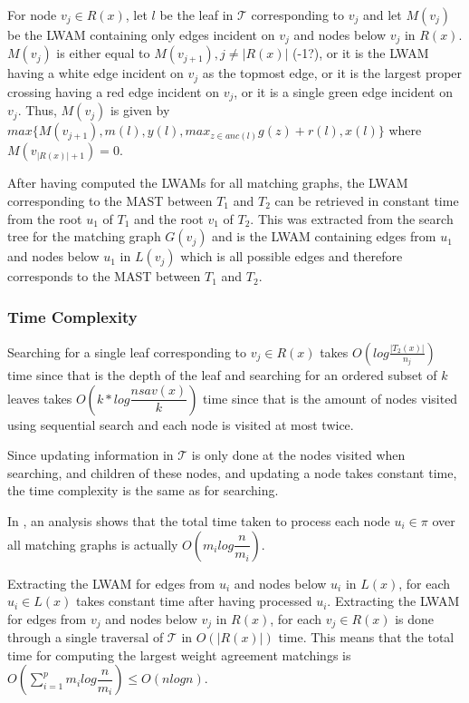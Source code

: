 For node $v_j \in R(x)$, let $l$ be the leaf in $\mathcal{T}$ corresponding to $v_j$ and let $M(v_j)$ be the LWAM containing only edges incident on $v_j$ and nodes below $v_j$ in $R(x)$. $M(v_j)$ is either equal to $M(v_{j+1}), j \ne |R(x)|$ (-1?), or it is the LWAM having a white edge incident on $v_j$ as the topmost edge, or it is the largest proper crossing having a red edge incident on $v_j$, or it is a single green edge incident on $v_j$. Thus, $M(v_j)$ is given by $max\{M(v_{j+1}), m(l), y(l), max_{z \in anc(l)}g(z) + r(l), x(l)\}$ where $M(v_{|R(x)|+1}) = 0$.

After having computed the LWAMs for all matching graphs, the LWAM corresponding to the MAST between $T_1$ and $T_2$ can be retrieved in constant time from the root $u_1$ of $T_1$ and the root $v_1$ of $T_2$. This was extracted from the search tree for the matching graph $G(v_j)$ and is the LWAM containing edges from $u_1$ and nodes below $u_1$ in $L(v_j)$ which is all possible edges and therefore corresponds to the MAST between $T_1$ and $T_2$.

\subsubsection{Time Complexity}
Searching for a single leaf corresponding to $v_j \in R(x)$ takes $O(log\frac{|T_2(x)|}{n_j})$ time since that is the depth of the leaf and searching for an ordered subset of $k$ leaves takes $O(k*log \dfrac{nsav(x)}{k})$ time since that is the amount of nodes visited using sequential search and each node is visited at most twice.

Since updating information in $\mathcal{T}$ is only done at the nodes visited when searching, and children of these nodes, and updating a node takes constant time, the time complexity is the same as for searching.

In \cite{nlogn}, an analysis shows that the total time taken to process each node $u_i \in \pi$ over all matching graphs is actually $O(m_ilog\dfrac{n}{m_i})$.

Extracting the LWAM for edges from $u_i$ and nodes below $u_i$ in $L(x)$, for each $u_i \in L(x)$ takes constant time after having processed $u_i$. Extracting the LWAM for edges from $v_j$ and nodes below $v_j$ in $R(x)$, for each $v_j \in R(x)$ is done through a single traversal of $\mathcal{T}$ in $O(|R(x)|)$ time. This means that the total time for computing the largest weight agreement matchings is $O(\sum_{i=1}^p m_ilog\dfrac{n}{m_i}) \le O(nlogn)$.

